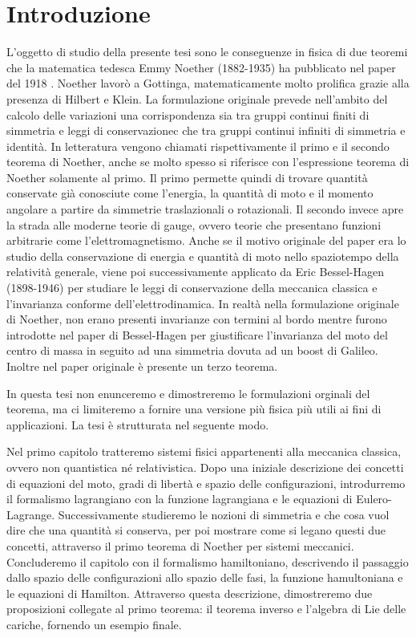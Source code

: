 \section*{Introduzione}

    L'oggetto di studio della presente tesi sono le conseguenze in fisica di due teoremi che la matematica tedesca Emmy Noether (1882-1935) ha pubblicato nel paper del 1918 \cite{noether}. Noether lavorò a Gottinga, matematicamente molto prolifica grazie alla presenza di Hilbert e Klein. La formulazione originale prevede nell'ambito del calcolo delle variazioni una corrispondenza sia tra gruppi continui finiti di simmetria e leggi di conservazionec che tra gruppi continui infiniti di simmetria e identità. In letteratura vengono chiamati rispettivamente il primo e il secondo teorema di Noether, anche se molto spesso si riferisce con l'espressione teorema di Noether solamente al primo. Il primo permette quindi di trovare quantità conservate già conosciute come l'energia, la quantità di moto e il momento angolare a partire da simmetrie traslazionali o rotazionali. Il secondo invece apre la strada alle moderne teorie di gauge, ovvero teorie che presentano funzioni arbitrarie come l'elettromagnetismo. Anche se il motivo originale del paper era lo studio della conservazione di energia e quantità di moto nello spaziotempo della relatività generale, viene poi successivamente applicato da Eric Bessel-Hagen (1898-1946) per studiare le leggi di conservazione della meccanica classica e l'invarianza conforme dell'elettrodinamica. In realtà nella formulazione originale di Noether, non erano presenti invarianze con termini al bordo mentre furono introdotte nel paper di Bessel-Hagen per giustificare l'invarianza del moto del centro di massa in seguito ad una simmetria dovuta ad un boost di Galileo. Inoltre nel paper originale è presente un terzo teorema.

    In questa tesi non enunceremo e dimostreremo le formulazioni orginali del teorema, ma ci limiteremo a fornire una versione più fisica più utili ai fini di applicazioni. La tesi è strutturata nel seguente modo. 
    
    Nel primo capitolo tratteremo sistemi fisici appartenenti alla meccanica classica, ovvero non quantistica né relativistica. Dopo una iniziale descrizione dei concetti di equazioni del moto, gradi di libertà e spazio delle configurazioni, introdurremo il formalismo lagrangiano con la funzione lagrangiana e le equazioni di Eulero-Lagrange. Successivamente studieremo le nozioni di simmetria e che cosa vuol dire che una quantità si conserva, per poi mostrare come si legano questi due concetti, attraverso il primo teorema di Noether per sistemi meccanici. Concluderemo il capitolo con il formalismo hamiltoniano, descrivendo il passaggio dallo spazio delle configurazioni allo spazio delle fasi, la funzione hamultoniana e le equazioni di Hamilton. Attraverso questa descrizione, dimostreremo due proposizioni collegate al primo teorema: il teorema inverso e l'algebra di Lie delle cariche, fornendo un esempio finale.

